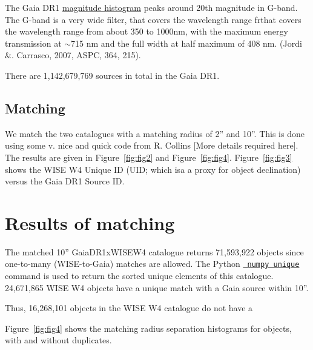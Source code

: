 \documentclass[11pt,a4paper]{article}
\begin{document}
    The Gaia DR1
    \href{https://www.cosmos.esa.int/documents/29201/1125416/magnitude+histogram+placeholder.png/}
    {magnitude histogram} peaks around 20th magnitude in G-band. The
    G-band is a very wide filter, that covers the wavelength range frthat
    covers the wavelength range from about 350 to 1000nm, with the maximum
    energy transmission at $\sim$715 nm and the full width at half maximum
    of 408 nm.  (Jordi \&. Carrasco, 2007, ASPC, 364, 215).
    
    There are 1,142,679,769 sources in total in the Gaia DR1. 



    \subsection{Matching}
    We match the two catalogues with a matching radius of 2'' and 10''. 
    This is done using some v. nice and quick code from R. Collins [More details required here]. 
    The results are given in Figure~\ref{fig:fig2} and Figure~\ref{fig:fig4}. 
    Figure~\ref{fig:fig3} shows the WISE W4 Unique ID (UID; which isa a proxy for object declination) 
    versus the Gaia DR1 Source ID. 


\section{Results of matching}
The matched 10'' GaiaDR1xWISEW4 catalogue returns 71,593,922 objects
since one-to-many (WISE-to-Gaia) matches are allowed. The Python
\href{https://docs.scipy.org/doc/numpy/reference/generated/numpy.unique.html}{{\tt
numpy unique}} command is used to return the sorted unique elements of
this catalogue. 24,671,865 WISE W4 objects have a unique match with a
Gaia source within 10''. 

Thus, 16,268,101 objects in the WISE W4 catalogue do not have a

Figure~\ref{fig:fig4} shows the matching radius separation histograms for objects, 
with and without duplicates. 
\end{document}
